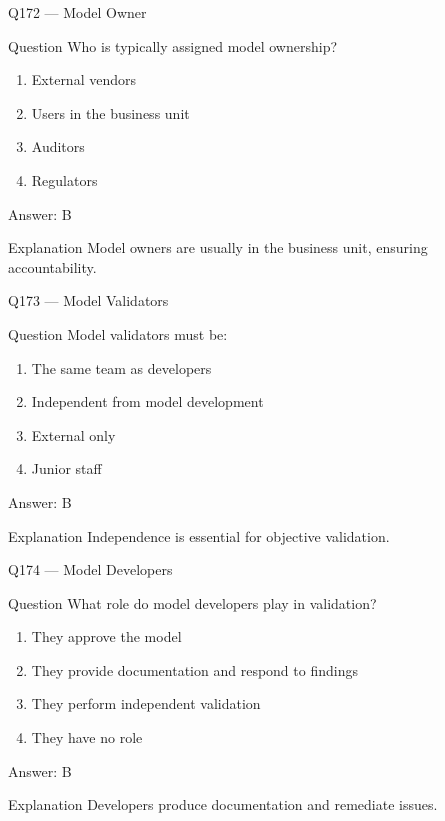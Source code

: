 \documentclass[aspectratio=169,8pt]{beamer}
\begin{document}
	\begin{frame}{Q172 --- Model Owner}
		\begin{block}{Question}
			Who is typically assigned model ownership?
		\end{block}
		\begin{enumerate}
			\item External vendors
			\item Users in the business unit
			\item Auditors
			\item Regulators
		\end{enumerate}
		\begin{exampleblock}{Answer: B}\end{exampleblock}
		\begin{block}{Explanation}
			Model owners are usually in the business unit, ensuring accountability.
		\end{block}
	\end{frame}
	
	\begin{frame}{Q173 --- Model Validators}
		\begin{block}{Question}
			Model validators must be:
		\end{block}
		\begin{enumerate}
			\item The same team as developers
			\item Independent from model development
			\item External only
			\item Junior staff
		\end{enumerate}
		\begin{exampleblock}{Answer: B}\end{exampleblock}
		\begin{block}{Explanation}
			Independence is essential for objective validation.
		\end{block}
	\end{frame}
	
	\begin{frame}{Q174 --- Model Developers}
		\begin{block}{Question}
			What role do model developers play in validation?
		\end{block}
		\begin{enumerate}
			\item They approve the model
			\item They provide documentation and respond to findings
			\item They perform independent validation
			\item They have no role
		\end{enumerate}
		\begin{exampleblock}{Answer: B}\end{exampleblock}
		\begin{block}{Explanation}
			Developers produce documentation and remediate issues.
		\end{block}
	\end{frame}
	
\end{document}
